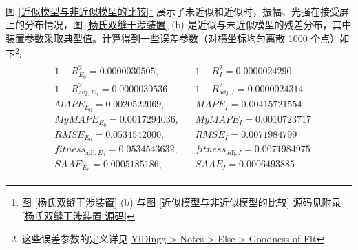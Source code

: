 \documentclass[UTF8]{report}
\theoremstyle{MyLineTheoremStyle} %
\theoremstyle{MyBlockTheoremStyle} %
\theoremstyle{MySubsubsectionStyle} %
\begin{document}
图 \ref{近似模型与非近似模型的比较}\footnote{图 \ref{杨氏双缝干涉装置} (b) 与图 \ref{近似模型与非近似模型的比较} 源码见附录 \ref{杨氏双缝干涉装置 源码}} 展示了未近似和近似时，振幅、光强在接受屏上的分布情况，图 \ref{杨氏双缝干涉装置} (b) 是近似与未近似模型的残差分布，其中装置参数采取典型值。计算得到一些误差参数（对横坐标均匀离散 1000 个点）如下\footnote{这些误差参数的定义详见 \href{https://yidingg.github.io/YiDingg/\#/Notes/Else/GoodnessOfFit}{YiDingg > Notes > Else > Goodness of Fit}}: 
\begin{gather}
\begin{aligned}
    &1 - R^2_{E_0} = 0.0000030505,              && 1 - R^2_{I} = 0.0000024290 \\
    &1 - R^2_{\text{adj}, E_0} = 0.0000030536,  && 1 - R^2_{\text{adj}, I} = 0.0000024314 \\
    & MAPE_{E_0}  = 0.0020522069, && MAPE_{I}  = 0.00415721554 \\
    & MyMAPE_{E_0}  = 0.0017294036, && MyMAPE_{I}  = 0.0010723717 \\
    & RMSE_{E_0}  = 0.0534542000, && RMSE_{I}  = 0.0071984799 \\
    & fitness_{\text{adj}, E_0}  = 0.0534543632, && fitness_{\text{adj}, I}  = 0.0071984975 \\
    & SAAE_{E_0}  = 0.0005185186, && SAAE_{I}  = 0.0006493885
\end{aligned}
\end{gather}

\end{document}
